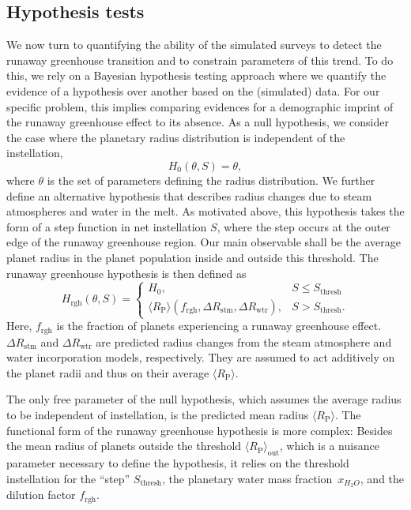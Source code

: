 \documentclass[twocolumn]{aastex631}
\begin{document}
\subsection{Hypothesis tests}
We now turn to quantifying the ability of the simulated surveys to detect the runaway greenhouse transition and to constrain parameters of this trend.
To do this, we rely on a Bayesian hypothesis testing approach where we quantify the evidence of a hypothesis over another based on the (simulated) data.
For our specific problem, this implies comparing evidences for a demographic imprint of the runaway greenhouse effect to its absence.
    As a null hypothesis, we consider the case where the planetary radius distribution is independent of the instellation,
    \begin{equation}
        H_0(\theta, S) = \theta,
    \end{equation}
    where $\theta$ is the set of parameters defining the radius distribution.
    We further define an alternative hypothesis that describes radius changes due to steam atmospheres and water in the melt.
    As motivated above, this hypothesis takes the form of a step function in net instellation $S$, where the step occurs at the outer edge of the runaway greenhouse region.
    Our main observable shall be the average planet radius in the planet population inside and outside this threshold.
    The runaway greenhouse hypothesis is then defined as
\begin{equation}\label{eq:rgh_hypo}
    H_{\mathrm{rgh}}(\theta, S) =
        \begin{cases}
            H_0, &  S \leq S_\mathrm{thresh}\\
            \langle R_\mathrm{P}\rangle (f_\mathrm{rgh},\Delta R_\mathrm{stm}, \Delta R_\mathrm{wtr}), &  S > S_\mathrm{thresh}.
        \end{cases}
\end{equation}
    Here, $f_\mathrm{rgh}$ is the fraction of planets experiencing a runaway greenhouse effect.
    $\Delta R_\mathrm{stm}$ and $\Delta R_\mathrm{wtr}$ are predicted radius changes from the steam atmosphere and water incorporation models, respectively.
    They are assumed to act additively on the planet radii and thus on their average $\langle R_\mathrm{P}\rangle $.

The only free parameter of the null hypothesis, which assumes the average radius to be independent of instellation, is the predicted mean radius $\langle R_\mathrm{P}\rangle $.
The functional form of the runaway greenhouse hypothesis is more complex: Besides the mean radius of planets outside the threshold $\langle R_\mathrm{P}\rangle_\mathrm{out}$, which is a nuisance parameter necessary to define the hypothesis, it relies on the threshold instellation for the ``step'' $S_\mathrm{thresh}$, the planetary water mass fraction~$x_{H_2O}$, and the dilution factor $f_\mathrm{rgh}$.
\end{document}
